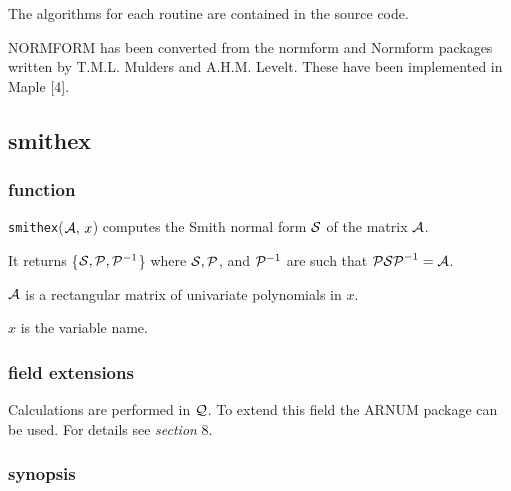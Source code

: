 The algorithms for each routine are contained in the source code.

{\small NORMFORM} has been converted from the normform and Normform 
packages written by T.M.L. Mulders and A.H.M. Levelt. These have been 
implemented in Maple [4].


\subsection{smithex}

\subsubsection{function}

{\tt smithex}(${\cal A},\, x$) computes the Smith normal form ${\cal S}$
of the matrix ${\cal A}$.

It returns \{${\cal S}, {\cal P}, {\cal P}^{-1}$\} where ${\cal S}, 
{\cal P}$, and ${\cal P}^{-1}$ are such that ${\cal P S P}^{-1} = 
{\cal A}$.

${\cal A}$ is a rectangular matrix of univariate polynomials in $x$.

$x$ is the variable name.

\subsubsection{field extensions}

Calculations are performed in ${\cal Q}$. To extend this field the 
{\small ARNUM} package can be used. For details see {\it section} 8.

\subsubsection{synopsis}

